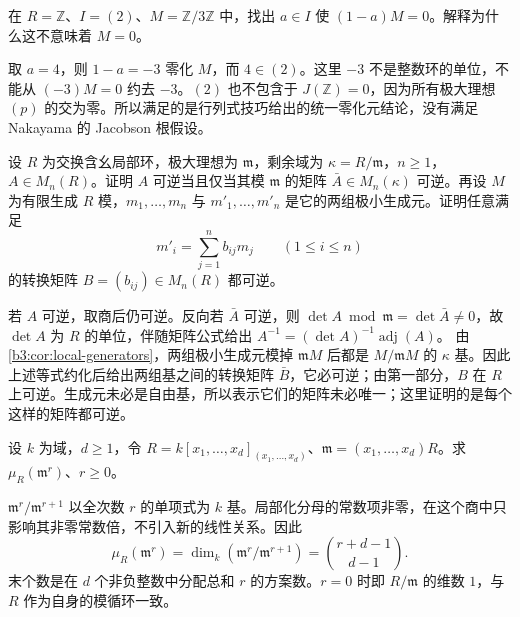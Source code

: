 \begin{exercise}\label{b3:ex:03-general-nakayama-factor}
	在 \(R=\mathbb Z\)、\(I=(2)\)、\(M=\mathbb Z/3\mathbb Z\) 中，找出 \(a\in I\) 使 \((1-a)M=0\)。解释为什么这不意味着 \(M=0\)。
\end{exercise}
\begin{solution}
	取 \(a=4\)，则 \(1-a=-3\) 零化 \(M\)，而 \(4\in(2)\)。这里 \(-3\) 不是整数环的单位，不能从 \((-3)M=0\) 约去 \(-3\)。\((2)\) 也不包含于 \(J(\mathbb Z)=0\)，因为所有极大理想 \((p)\) 的交为零。所以满足的是行列式技巧给出的统一零化元结论，没有满足 Nakayama 的 Jacobson 根假设。
\end{solution}

\begin{exercise}\label{b3:ex:03-local-matrix}
	设 \(R\) 为交换含幺局部环，极大理想为 \(\mathfrak m\)，剩余域为 \(\kappa=R/\mathfrak m\)，\(n\ge1\)，\(A\in M_n(R)\)。证明 \(A\) 可逆当且仅当其模 \(\mathfrak m\) 的矩阵 \(\bar A\in M_n(\kappa)\) 可逆。再设 \(M\) 为有限生成 \(R\) 模，\(m_1,\ldots,m_n\) 与 \(m'_1,\ldots,m'_n\) 是它的两组极小生成元。证明任意满足
	\[
		m'_i=\sum_{j=1}^n b_{ij}m_j\qquad(1\le i\le n)
	\]
	的转换矩阵 \(B=(b_{ij})\in M_n(R)\) 都可逆。
\end{exercise}
\begin{solution}
	若 \(A\) 可逆，取商后仍可逆。反向若 \(\bar A\) 可逆，则 \(\det A\bmod\mathfrak m=\det\bar A\ne0\)，故 \(\det A\) 为 \(R\) 的单位，伴随矩阵公式给出 \(A^{-1}=(\det A)^{-1}\operatorname{adj}(A)\)。 由\cref{b3:cor:local-generators}，两组极小生成元模掉 \(\mathfrak mM\) 后都是 \(M/\mathfrak mM\) 的 \(\kappa\) 基。因此上述等式约化后给出两组基之间的转换矩阵 \(\bar B\)，它必可逆；由第一部分，\(B\) 在 \(R\) 上可逆。生成元未必是自由基，所以表示它们的矩阵未必唯一；这里证明的是每个这样的矩阵都可逆。
\end{solution}

\begin{exercise}\label{b3:ex:03-minimal-power-generators}
	设 \(k\) 为域，\(d\ge1\)，令 \(R=k[x_1,\ldots,x_d]_{(x_1,\ldots,x_d)}\)、\(\mathfrak m=(x_1,\ldots,x_d)R\)。求 \(\mu_R(\mathfrak m^r)\)、\(r\ge0\)。
\end{exercise}
\begin{solution}
	\(\mathfrak m^r/\mathfrak m^{r+1}\) 以全次数 \(r\) 的单项式为 \(k\) 基。局部化分母的常数项非零，在这个商中只影响其非零常数倍，不引入新的线性关系。因此
	\[
		\mu_R(\mathfrak m^r)=\dim_k(\mathfrak m^r/\mathfrak m^{r+1}) =\binom{r+d-1}{d-1}.
	\]
	末个数是在 \(d\) 个非负整数中分配总和 \(r\) 的方案数。\(r=0\) 时即 \(R/\mathfrak m\) 的维数 \(1\)，与 \(R\) 作为自身的模循环一致。
\end{solution}

